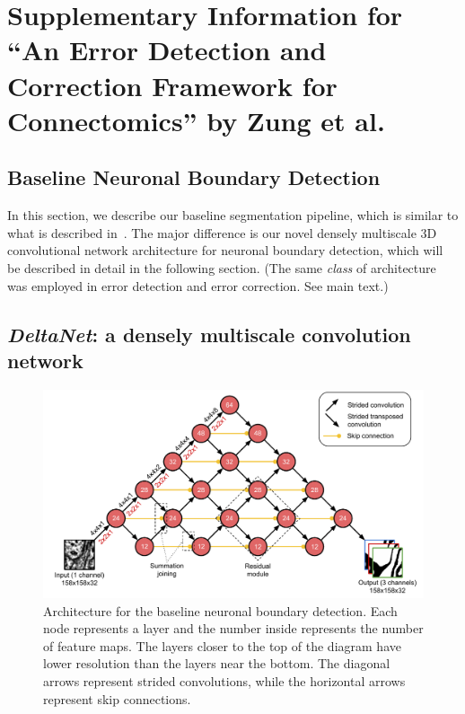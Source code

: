 \documentclass{article}
\begin{document}
\section*{Supplementary Information for ``An Error Detection and Correction Framework for Connectomics'' by Zung et al.}

\begin{appendices}

\section{Baseline Neuronal Boundary Detection}
\label{appendix:baseline}

In this section, we describe our baseline segmentation pipeline, which is
similar to what is described in~\cite{kisuk}. The major difference is our novel
densely multiscale 3D convolutional network architecture for neuronal boundary
detection, which will be described in detail in the following section. (The same
\emph{class} of architecture was employed in error detection and error
correction. See main text.)

\subsection{\textsl{DeltaNet}: a densely multiscale convolution network}

\begin{figure}[!b]
\centering
\includegraphics[width=1.0\linewidth]{baseline.pdf}

\caption{Architecture for the baseline neuronal boundary detection. Each node
represents a layer and the number inside represents the number of feature maps.
The layers closer to the top of the diagram have lower resolution than the
layers near the bottom. The diagonal arrows represent strided convolutions,
while the horizontal arrows represent skip connections.}


\end{figure}
\end{appendices}
\end{document}
